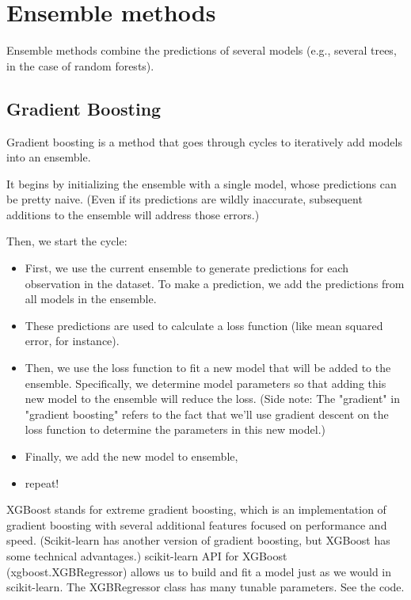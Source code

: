\documentclass[12pt]{report}
\begin{document}
\section{Ensemble methods}
Ensemble methods combine the predictions of several models (e.g., several trees, in the case of random forests).

\subsection{Gradient Boosting}
Gradient boosting is a method that goes through cycles to iteratively add models into an ensemble.

It begins by initializing the ensemble with a single model, whose predictions can be pretty naive. (Even if its predictions are wildly inaccurate, subsequent additions to the ensemble will address those errors.)

Then, we start the cycle:
\begin{itemize}
  \item First, we use the current ensemble to generate predictions for each observation in the dataset. To make a prediction, we add the predictions from all models in the ensemble.
  \item These predictions are used to calculate a loss function (like mean squared error, for instance).
  \item Then, we use the loss function to fit a new model that will be added to the ensemble. Specifically, we determine model parameters so that adding this new model to the ensemble will reduce the loss. (Side note: The "gradient" in "gradient boosting" refers to the fact that we'll use gradient descent on the loss function to determine the parameters in this new model.)
  \item Finally, we add the new model to ensemble,
  \item repeat!
\end{itemize}

XGBoost stands for extreme gradient boosting, which is an implementation of gradient boosting with several additional features focused on performance and speed. (Scikit-learn has another version of gradient boosting, but XGBoost has some technical advantages.) scikit-learn API for XGBoost (xgboost.XGBRegressor) allows us to build and fit a model just as we would in scikit-learn. The XGBRegressor class has many tunable parameters. See the code.
\end{document}
